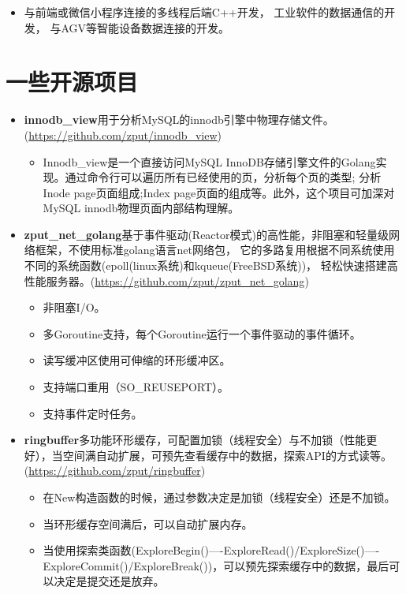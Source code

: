 \documentclass{resume}
\begin{document}
\begin{itemize}[parsep=0.2ex]
  \item 与前端或微信小程序连接的多线程后端C++开发， 工业软件的数据通信的开发， 与AGV等智能设备数据连接的开发。
\end{itemize}

\section{一些开源项目}
\begin{itemize}[parsep=0.2ex]
  \item \textbf{innodb\_view}用于分析MySQL的innodb引擎中物理存储文件。(\url{https://github.com/zput/innodb_view})
    \begin{itemize}[parsep=0.2ex]
        \item Innodb\_view是一个直接访问MySQL InnoDB存储引擎文件的Golang实现。通过命令行可以遍历所有已经使用的页，分析每个页的类型; 分析Inode page页面组成;Index page页面的组成等。此外，这个项目可加深对MySQL innodb物理页面内部结构理解。
    \end{itemize}

  \item \textbf{zput\_net\_golang}基于事件驱动(Reactor模式)的高性能，非阻塞和轻量级网络框架，不使用标准golang语言net网络包， 它的多路复用根据不同系统使用不同的系统函数(epoll(linux系统)和kqueue(FreeBSD系统))， 轻松快速搭建高性能服务器。(\url{https://github.com/zput/zput_net_golang})
    \begin{itemize}[parsep=0.2ex]
          \item 非阻塞I/O。
          \item 多Goroutine支持，每个Goroutine运行一个事件驱动的事件循环。
          \item 读写缓冲区使用可伸缩的环形缓冲区。
          \item 支持端口重用（SO\_REUSEPORT）。
          \item 支持事件定时任务。
    \end{itemize}

  \item \textbf{ringbuffer}多功能环形缓存，可配置加锁（线程安全）与不加锁（性能更好），当空间满自动扩展，可预先查看缓存中的数据，探索API的方式读等。(\url{https://github.com/zput/ringbuffer})
    \begin{itemize}[parsep=0.2ex]
          \item 在New构造函数的时候，通过参数决定是加锁（线程安全）还是不加锁。
          \item 当环形缓存空间满后，可以自动扩展内存。
          \item 当使用探索类函数(ExploreBegin()----ExploreRead()/ExploreSize()----ExploreCommit()/ExploreBreak())，可以预先探索缓存中的数据，最后可以决定是提交还是放弃。
    \end{itemize}


\end{itemize}
\end{document}
